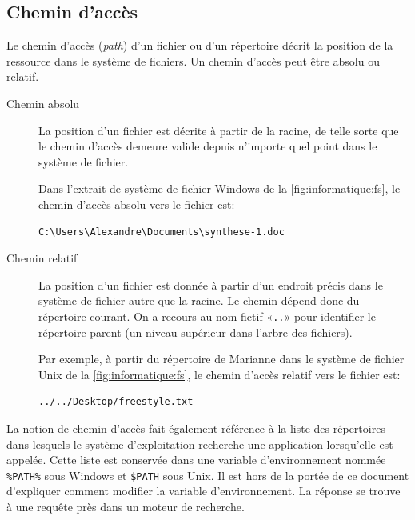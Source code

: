 \subsection{Chemin d'accès}
\label{sec:informatique:fs:path}

Le chemin d'accès (\emph{path}) d'un fichier ou
d'un répertoire décrit la position de la ressource dans le système de
fichiers. Un chemin d'accès peut être absolu ou relatif.
\begin{description}
\item[Chemin absolu]  La position d'un
  fichier est décrite à partir de la racine, de telle sorte que le
  chemin d'accès demeure valide depuis n'importe quel point dans le
  système de fichier.

  Dans l'extrait de système de fichier Windows de la
  \autoref{fig:informatique:fs}, le chemin d'accès absolu vers le
  fichier  est:
\begin{Schunk}
\begin{Verbatim}
C:\Users\Alexandre\Documents\synthese-1.doc
\end{Verbatim}
\end{Schunk}
\item[Chemin relatif]  La position d'un
  fichier est donnée à partir d'un endroit précis dans le système de
  fichier autre que la racine. Le chemin dépend donc du répertoire
  courant. On a recours au nom fictif «\verb=..=» pour identifier le
  répertoire parent (un niveau supérieur dans l'arbre des fichiers).

  Par exemple, à partir du répertoire  de
  Marianne dans le système de fichier Unix de la
  \autoref{fig:informatique:fs}, le chemin d'accès relatif vers le
  fichier  est:
\begin{Schunk}
\begin{Verbatim}
../../Desktop/freestyle.txt
\end{Verbatim}
\end{Schunk}
\end{description}

La notion de chemin d'accès fait également référence à la liste des
répertoires dans lesquels le système d'exploitation recherche une
application lorsqu'elle est appelée. Cette liste est conservée dans
une variable d'environnement nommée \verb=%PATH%= sous Windows
et \verb=$PATH= sous Unix. Il est hors de la portée de ce
document d'expliquer comment modifier la variable d'environnement. La
réponse se trouve à une requête près dans un moteur de recherche.


